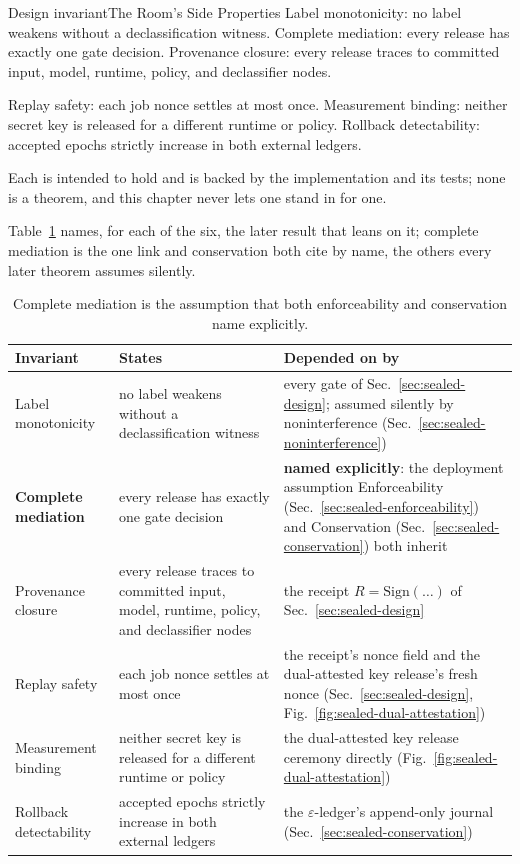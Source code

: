 \documentclass[11pt,a4paper]{article}
\theoremstyle{definition}
\begin{document}
\begin{pdclaim}{Design invariant}{The Room's Side Properties}
\setlength{\parskip}{4pt plus 1pt}
\label{inv:sealed-side}
Label monotonicity: no label weakens without a declassification witness.
Complete mediation: every release has exactly one gate decision. Provenance
closure: every release traces to committed input, model, runtime, policy, and
declassifier nodes.

Replay safety: each job nonce settles at most once.
Measurement binding: neither secret key is released for a different runtime
or policy. Rollback detectability: accepted epochs strictly increase in both
external ledgers.

Each is intended to hold and is backed by the implementation
and its tests; none is a theorem, and this chapter never lets one stand in for
one.
\end{pdclaim}

Table~\ref{tab:sealed-side-invariants} names, for each of the six, the later
result that leans on it; complete mediation is the one link and conservation
both cite by name, the others every later theorem assumes silently.

\begin{table}[H]\centering\footnotesize
\caption{Complete mediation is the assumption that both enforceability and
conservation name explicitly.}
\label{tab:sealed-side-invariants}
\begin{tabularx}{\textwidth}{@{}>{\raggedright\arraybackslash}p{2.6cm} >{\raggedright\arraybackslash}X >{\raggedright\arraybackslash}p{3.6cm}@{}}
\toprule
Invariant & States & Depended on by \\
\midrule
Label monotonicity & no label weakens without a declassification witness & every gate of Sec.~\ref{sec:sealed-design}; assumed silently by noninterference (Sec.~\ref{sec:sealed-noninterference}) \\
\textbf{Complete mediation} & every release has exactly one gate decision & \textbf{named explicitly}: the deployment assumption Enforceability (Sec.~\ref{sec:sealed-enforceability}) and Conservation (Sec.~\ref{sec:sealed-conservation}) both inherit \\
Provenance closure & every release traces to committed input, model, runtime, policy, and declassifier nodes & the receipt $R=\mathrm{Sign}(\ldots)$ of Sec.~\ref{sec:sealed-design} \\
Replay safety & each job nonce settles at most once & the receipt's nonce field and the dual-attested key release's fresh nonce (Sec.~\ref{sec:sealed-design}, Fig.~\ref{fig:sealed-dual-attestation}) \\
Measurement binding & neither secret key is released for a different runtime or policy & the dual-attested key release ceremony directly (Fig.~\ref{fig:sealed-dual-attestation}) \\
Rollback detectability & accepted epochs strictly increase in both external ledgers & the $\varepsilon$-ledger's append-only journal (Sec.~\ref{sec:sealed-conservation}) \\
\bottomrule
\end{tabularx}
\end{table}
\end{document}
